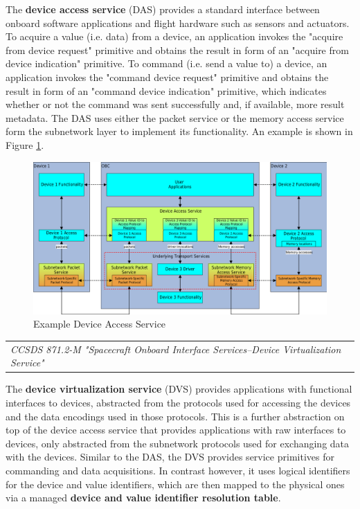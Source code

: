 The \textbf{device access service} (DAS) provides a standard interface between onboard software applications and flight hardware such as sensors and actuators. To acquire a value (i.e. data) from a device, an application invokes the "acquire from device request" primitive and obtains the result in form of an "acquire from device indication" primitive. To command (i.e. send a value to) a device, an application invokes the "command device request" primitive and obtains the result in form of an "command device indication" primitive, which indicates whether or not the command was sent successfully and, if available, more result metadata. The DAS uses either the packet service or the memory access service form the subnetwork layer to implement its functionality. An example is shown in Figure \ref{fig:Example Device Access Service}.

\begin{figure}[h]
\centering\includegraphics[scale=0.3]{fig/example_device_access_service}
\caption{Example Device Access Service}
\label{fig:Example Device Access Service}
\end{figure}

\begin{tabular}{l}
\textit{CCSDS 871.2-M "Spacecraft Onboard Interface Services--Device Virtualization Service" \cite{CCSDS 871.2-M}} 
\end{tabular}

The \textbf{device virtualization service} (DVS) provides applications with functional interfaces to devices, abstracted from the protocols used for accessing the devices and the data encodings used in those protocols. This is a further abstraction on top of the device access service that provides applications with raw interfaces to devices, only abstracted from the subnetwork protocols used for exchanging data with the devices. Similar to the DAS, the DVS provides service primitives for commanding and data acquisitions. In contrast however, it uses logical identifiers for the device and value identifiers, which are then mapped to the physical ones via a managed \textbf{device and value identifier resolution table}.

